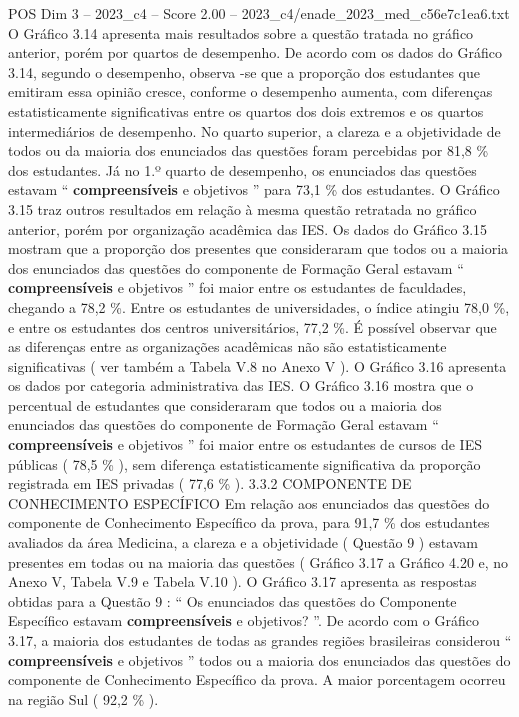 \begin{textsample}{POS Dim 3 – 2023\_c4 – Score 2.00 – 2023\_c4/enade\_2023\_med\_c56e7c1ea6.txt}
O Gráfico 3.14 apresenta mais resultados sobre a questão tratada no gráfico anterior, porém por quartos de desempenho.
De acordo com os dados do Gráfico 3.14, segundo o desempenho, observa -se que a proporção dos estudantes que emitiram essa opinião cresce, conforme o desempenho aumenta, com diferenças estatisticamente significativas entre os quartos dos dois extremos e os quartos intermediários de desempenho.
No quarto superior, a clareza e a objetividade de todos ou da maioria dos enunciados das questões foram percebidas por 81,8 \% dos estudantes.
Já no 1.º quarto de desempenho, os enunciados das questões estavam “ \textbf{compreensíveis} e objetivos ” para 73,1 \% dos estudantes.
O Gráfico 3.15 traz outros resultados em relação à mesma questão retratada no gráfico anterior, porém por organização acadêmica das IES.
Os dados do Gráfico 3.15 mostram que a proporção dos presentes que consideraram que todos ou a maioria dos enunciados das questões do componente de Formação Geral estavam “ \textbf{compreensíveis} e objetivos ” foi maior entre os estudantes de faculdades, chegando a 78,2 \%.
Entre os estudantes de universidades, o índice atingiu 78,0 \%, e entre os estudantes dos centros universitários, 77,2 \%.
É possível observar que as diferenças entre as organizações acadêmicas não são estatisticamente significativas ( ver também a Tabela V.8 no Anexo V ).
O Gráfico 3.16 apresenta os dados por categoria administrativa das IES.
O Gráfico 3.16 mostra que o percentual de estudantes que consideraram que todos ou a maioria dos enunciados das questões do componente de Formação Geral estavam “ \textbf{compreensíveis} e objetivos ” foi maior entre os estudantes de cursos de IES públicas ( 78,5 \% ), sem diferença estatisticamente significativa da proporção registrada em IES privadas ( 77,6 \% ). 3.3.2 COMPONENTE DE CONHECIMENTO ESPECÍFICO Em relação aos enunciados das questões do componente de Conhecimento Específico da prova, para 91,7 \% dos estudantes avaliados da área Medicina, a clareza e a objetividade ( Questão 9 ) estavam presentes em todas ou na maioria das questões ( Gráfico 3.17 a Gráfico 4.20 e, no Anexo V, Tabela V.9 e Tabela V.10 ).
O Gráfico 3.17 apresenta as respostas obtidas para a Questão 9 : “ Os enunciados das questões do Componente Específico estavam \textbf{compreensíveis} e objetivos? ”.
De acordo com o Gráfico 3.17, a maioria dos estudantes de todas as grandes regiões brasileiras considerou “ \textbf{compreensíveis} e objetivos ” todos ou a maioria dos enunciados das questões do componente de Conhecimento Específico da prova.
A maior porcentagem ocorreu na região Sul ( 92,2 \% ).

\end{textsample}
